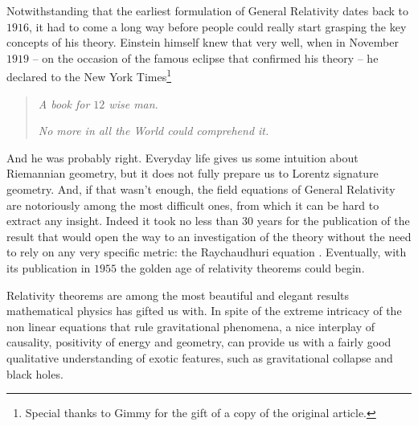 Notwithstanding that the earliest formulation of General Relativity dates back to \(1916\), it had to come a long way before people could really start grasping the key concepts of his theory. Einstein himself knew that very well, when in November \(1919\) -- on the occasion of the famous eclipse that confirmed his theory -- he declared to the New York Times\footnote{Special thanks to Gimmy for the gift of a copy of the original article.} \cite{nyt:lights-all-askew}
\begin{quote}
    \emph{A book for \(12\) wise man. }
    
    \emph{No more in all the World could comprehend it.}
\end{quote}
And he was probably right. Everyday life gives us some intuition about Riemannian geometry, but it does not fully prepare us to Lorentz signature geometry. And, if that wasn't enough, the field equations of General Relativity are notoriously among the most difficult ones, from which it can be hard to extract any insight. Indeed it took no less than \(30\) years for the publication of the result that would open the way to an investigation of the theory without the need to rely on any very specific metric: the Raychaudhuri equation \cite[]{raychaudhuri1955relativistic}. Eventually, with its publication in \(1955\) the golden age of relativity theorems could begin.

Relativity theorems are among the most beautiful and elegant results mathematical physics has gifted us with. In spite of the extreme intricacy of the non linear equations that rule gravitational phenomena, a nice interplay of causality, positivity of energy and geometry, can provide us with a fairly good qualitative understanding of exotic features, such as gravitational collapse and black holes.


